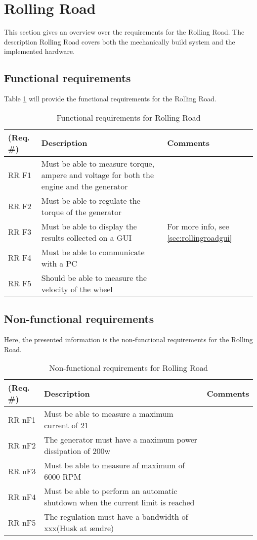 \section{Rolling Road}
This section gives an overview over the requirements for the Rolling Road. The description Rolling Road covers both the mechanically build system and the implemented hardware. 

\subsection{Functional requirements}
Table \ref{Functional:Rolling Road} will provide the functional requirements for the Rolling Road.

\begin{table}[h!]
	\centering
	\begin{tabular}{|p{2 cm}|p{4 cm}|p{3 cm}|}
	\hline
	\textbf{(Req. \#)} & \textbf{Description} & \textbf{Comments} \\\hline
	RR F1	& Must be able to measure torque, ampere and voltage for both the engine and the generator  &   \\\hline
	RR F2	& Must be able to regulate the torque of the generator &   \\\hline
	RR F3	& Must be able to display the results collected on a GUI & For more info, see \ref{sec:rollingroadgui}  \\\hline
	RR F4	& Must be able to communicate with a PC &   \\\hline
	RR F5	& Should be able to measure the velocity of the wheel &   \\\hline
	\end{tabular}
	\label{Functional:Rolling Road}
	\caption{Functional requirements for Rolling Road}
\end{table}

\subsection{Non-functional requirements}
Here, the presented information is the non-functional requirements for the Rolling Road.

\begin{table}[h!]
	\centering
	\begin{tabular}{|p{2 cm}|p{4 cm}|p{3 cm}|}
		\hline
		\textbf{(Req. \#)} & \textbf{Description} & \textbf{Comments} \\\hline
		RR nF1	& Must be able to measure a maximum current of 21 \fxnote{tjek op på dette}  &   \\\hline
		RR nF2	& The generator must have a maximum power dissipation of 200w &   \\\hline
		RR nF3	& Must be able to measure af maximum of 6000 RPM &   \\\hline
		RR nF4	& Must be able to perform an automatic shutdown when the current limit is reached &   \\\hline
		RR nF5	& The regulation must have a bandwidth of xxx\fxnote(Husk at ændre) &   \\\hline
	\end{tabular}
	\label{Nonfunctional:RollingRoad}
	\caption{Non-functional requirements for Rolling Road}
\end{table}